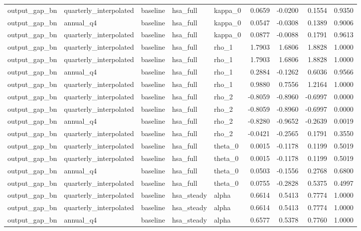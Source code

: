 \begin{tabular}{lllllrrrr}
output\_gap\_bn & quarterly\_interpolated & baseline & hsa\_full & kappa\_0 & 0.0659 & -0.0200 & 0.1554 & 0.9350 \\
output\_gap\_bn & annual\_q4 & baseline & hsa\_full & kappa\_0 & 0.0547 & -0.0308 & 0.1389 & 0.9006 \\
output\_gap\_bn & quarterly\_interpolated & baseline & hsa\_full & kappa\_0 & 0.0877 & -0.0088 & 0.1791 & 0.9613 \\
output\_gap\_bn & quarterly\_interpolated & baseline & hsa\_full & rho\_1 & 1.7903 & 1.6806 & 1.8828 & 1.0000 \\
output\_gap\_bn & quarterly\_interpolated & baseline & hsa\_full & rho\_1 & 1.7903 & 1.6806 & 1.8828 & 1.0000 \\
output\_gap\_bn & annual\_q4 & baseline & hsa\_full & rho\_1 & 0.2884 & -0.1262 & 0.6036 & 0.9566 \\
output\_gap\_bn & quarterly\_interpolated & baseline & hsa\_full & rho\_1 & 0.9880 & 0.7556 & 1.2164 & 1.0000 \\
output\_gap\_bn & quarterly\_interpolated & baseline & hsa\_full & rho\_2 & -0.8059 & -0.8960 & -0.6997 & 0.0000 \\
output\_gap\_bn & quarterly\_interpolated & baseline & hsa\_full & rho\_2 & -0.8059 & -0.8960 & -0.6997 & 0.0000 \\
output\_gap\_bn & annual\_q4 & baseline & hsa\_full & rho\_2 & -0.8280 & -0.9652 & -0.2639 & 0.0019 \\
output\_gap\_bn & quarterly\_interpolated & baseline & hsa\_full & rho\_2 & -0.0421 & -0.2565 & 0.1791 & 0.3550 \\
output\_gap\_bn & quarterly\_interpolated & baseline & hsa\_full & theta\_0 & 0.0015 & -0.1178 & 0.1199 & 0.5019 \\
output\_gap\_bn & quarterly\_interpolated & baseline & hsa\_full & theta\_0 & 0.0015 & -0.1178 & 0.1199 & 0.5019 \\
output\_gap\_bn & annual\_q4 & baseline & hsa\_full & theta\_0 & 0.0503 & -0.1556 & 0.2768 & 0.6800 \\
output\_gap\_bn & quarterly\_interpolated & baseline & hsa\_full & theta\_0 & 0.0755 & -0.2828 & 0.5375 & 0.4997 \\
output\_gap\_bn & quarterly\_interpolated & baseline & hsa\_steady & alpha & 0.6614 & 0.5413 & 0.7774 & 1.0000 \\
output\_gap\_bn & quarterly\_interpolated & baseline & hsa\_steady & alpha & 0.6614 & 0.5413 & 0.7774 & 1.0000 \\
output\_gap\_bn & annual\_q4 & baseline & hsa\_steady & alpha & 0.6577 & 0.5378 & 0.7760 & 1.0000 \\

\end{tabular}
